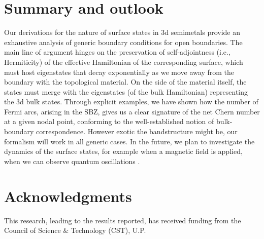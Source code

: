 \documentclass[aps,prb,onecolumn, footinbib, 10pt]{revtex4-2}
\begin{document}
\section{Summary and outlook}
\label{secsum}

Our derivations for the nature of surface states in 3d semimetals provide an exhaustive analysis of generic boundary conditions for open boundaries. The main line of argument hinges on the preservation of self-adjointness (i.e., Hermiticity) of the effective Hamiltonian of the corresponding surface, which must host eigenstates that decay exponentially as we move away from the boundary with the topological material. On the side of the material itself, the states must merge with the eigenstates (of the bulk Hamiltonian) representing the 3d bulk states. Through explicit examples, we have shown how the number of Fermi arcs, arising in the SBZ, gives us a clear signature of the net Chern number at a given nodal point, conforming to the well-established notion of bulk-boundary correspondence. However exotic the bandstructure might be, our formalism will work in all generic cases. In the future, we plan to investigate the dynamics of the surface states, for example when a magnetic field is applied, when we can observe quantum oscillations \cite{qtm-osc-ashvin, *hosur-arc-osc}.




\section*{Acknowledgments}

This research, leading to the results reported, has received funding from the Council of Science \& Technology (CST), U.P.




\end{document}
